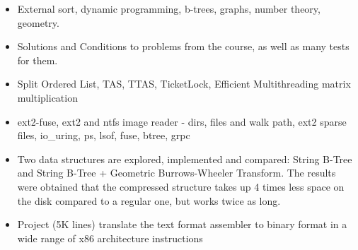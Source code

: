 \documentclass[10pt,a4paper]{altacv}
\begin{document}




\begin{itemize}
  \item \small{External sort, dynamic programming, b-trees, graphs, number theory, geometry.}
  \item \small{Solutions and Conditions to problems from the course, as well as many tests for them.}
\end{itemize}
\divider

\begin{itemize}
  \item \small{Split Ordered List, TAS, TTAS, TicketLock, Efficient Multithreading matrix multiplication}
\end{itemize}
\divider

\begin{itemize}
  \item \small{ext2-fuse, ext2 and ntfs image reader - dirs, files and walk path, ext2 sparse files, io\_uring, ps, lsof, fuse, btree, grpc}
\end{itemize}
\divider

\begin{itemize}
  \item \small{Two data structures are explored, implemented and compared: String B-Tree and String B-Tree + Geometric Burrows-Wheeler Transform. The results were obtained that the compressed structure takes up 4 times less space on the disk compared to a regular one, but works twice as long.}
\end{itemize}
\divider

\begin{itemize}
  \item \small{Project (5K lines) translate the text format assembler to binary format in a wide range of x86 architecture instructions}
\end{itemize}
\divider
\end{document}
